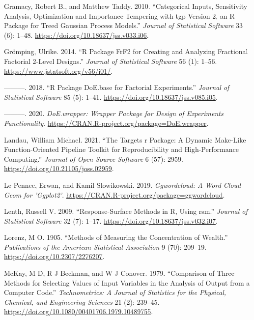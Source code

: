 \begin{CSLReferences}{1}{0}
\leavevmode{}%
Gramacy, Robert B., and Matthew Taddy. 2010. {``Categorical Inputs, Sensitivity Analysis, Optimization and Importance Tempering with {tgp} Version 2, an {R} Package for Treed Gaussian Process Models.''} \emph{Journal of Statistical Software} 33 (6): 1--48. \url{https://doi.org/10.18637/jss.v033.i06}.

\leavevmode{}%
Grömping, Ulrike. 2014. {``{R} Package {FrF2} for Creating and Analyzing Fractional Factorial 2-Level Designs.''} \emph{Journal of Statistical Software} 56 (1): 1--56. \url{https://www.jstatsoft.org/v56/i01/}.

\leavevmode{}%
---------. 2018. {``{R} Package {DoE.base} for Factorial Experiments.''} \emph{Journal of Statistical Software} 85 (5): 1--41. \url{https://doi.org/10.18637/jss.v085.i05}.

\leavevmode{}%
---------. 2020. \emph{DoE.wrapper: Wrapper Package for Design of Experiments Functionality}. \url{https://CRAN.R-project.org/package=DoE.wrapper}.

\leavevmode{}%
Landau, William Michael. 2021. {``The Targets r Package: A Dynamic Make-Like Function-Oriented Pipeline Toolkit for Reproducibility and High-Performance Computing.''} \emph{Journal of Open Source Software} 6 (57): 2959. \url{https://doi.org/10.21105/joss.02959}.

\leavevmode{}%
Le Pennec, Erwan, and Kamil Slowikowski. 2019. \emph{Ggwordcloud: A Word Cloud Geom for 'Ggplot2'}. \url{https://CRAN.R-project.org/package=ggwordcloud}.

\leavevmode{}%
Lenth, Russell V. 2009. {``Response-Surface Methods in {R}, Using {rsm}.''} \emph{Journal of Statistical Software} 32 (7): 1--17. \url{https://doi.org/10.18637/jss.v032.i07}.

\leavevmode{}%
Lorenz, M O. 1905. {``Methods of Measuring the Concentration of Wealth.''} \emph{Publications of the American Statistical Association} 9 (70): 209--19. \url{https://doi.org/10.2307/2276207}.

\leavevmode{}%
McKay, M D, R J Beckman, and W J Conover. 1979. {``Comparison of Three Methods for Selecting Values of Input Variables in the Analysis of Output from a Computer Code.''} \emph{Technometrics: A Journal of Statistics for the Physical, Chemical, and Engineering Sciences} 21 (2): 239--45. \url{https://doi.org/10.1080/00401706.1979.10489755}.


\end{CSLReferences}

